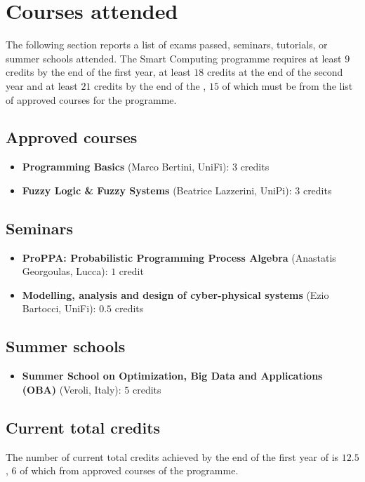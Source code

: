 
\section*{Courses attended}
  The following section reports a list of exams passed, seminars, tutorials, or summer schools attended. The Smart Computing  programme requires at least $9$ credits by the end of the first year, at least $18$ credits at the end of the second year and at least $21$ credits by the end of the , $15$ of which must be from the list of approved courses for the  programme.

  \subsection*{Approved courses}
  
    \begin{itemize}
      \item \textbf{ Programming Basics} (Marco Bertini, \ac{UniFi}): $3$ credits
      \item \textbf{Fuzzy Logic \& Fuzzy Systems} (Beatrice Lazzerini, \ac{UniPi}): $3$ credits
    \end{itemize}
    
  \subsection*{Seminars}
  
    \begin{itemize}
      \item \textbf{\ac{ProPPA}: Probabilistic Programming Process Algebra} (Anastatis Georgoulas,  Lucca): $1$ credit
      \item \textbf{Modelling, analysis and design of cyber-physical systems} (Ezio Bartocci, \ac{UniFi}): $0.5$ credits
    \end{itemize}
    
  \subsection*{Summer schools}
  
    \begin{itemize}
      \item \textbf{Summer School on Optimization, Big Data and Applications (\ac{OBA})} (Veroli, Italy): $5$ credits
    \end{itemize}
    
  \subsection*{Current total credits}
  
    The number of current total credits achieved by the end of the first year of  is $12.5$, $6$ of which from approved courses of the  programme.
    
\newpage
  